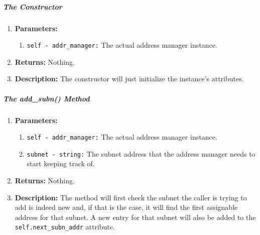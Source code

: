         \subparagraph{The Constructor}
            \begin{enumerate}
                \item \textbf{Parameters:}
                \begin{enumerate}
                    \item \texttt{self - addr\_manager:} The actual address manager instance.
                \end{enumerate}
                \item \textbf{Returns:} Nothing.
                \item \textbf{Description:} The constructor will just initialize the instance's attributes.
            \end{enumerate}

        \subparagraph{The add\_subn() Method}
            \begin{enumerate}
                \item \textbf{Parameters:}
                \begin{enumerate}
                    \item \texttt{self - addr\_manager:} The actual address manager instance.
                    \item \texttt{subnet - string:} The subnet address that the address manager needs to start keeping track of.
                \end{enumerate}
                \item \textbf{Returns:} Nothing.
                \item \textbf{Description:} The method will first check the subnet the caller is trying to add is indeed new and, if that is the case, it will find the first assignable address for that subnet. A new entry for that subnet will also be added to the \texttt{self.next\_subn\_addr} attribute.
            \end{enumerate}

